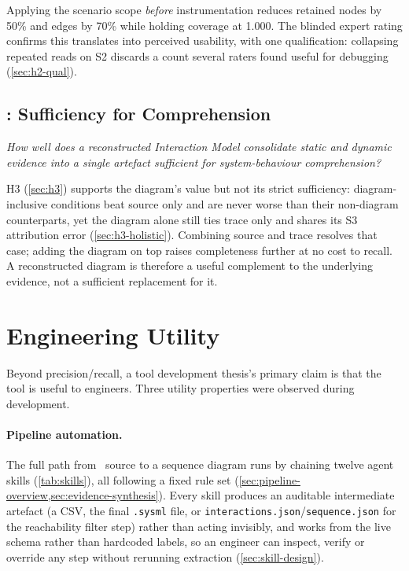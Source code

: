 Applying the scenario scope \emph{before} instrumentation reduces
retained nodes by 50\% and edges by 70\% while holding coverage at
1.000. The blinded expert rating confirms this translates into
perceived usability, with one qualification: collapsing repeated reads
on S2 discards a count several raters found useful for debugging
(\cref{sec:h2-qual}).

\subsection*{\rqthree: Sufficiency for Comprehension}

\textit{How well does a reconstructed \sysml Interaction Model
consolidate static and dynamic evidence into a single artefact sufficient
for system-behaviour comprehension?}

H3 (\cref{sec:h3}) supports the diagram's value but not its strict
sufficiency: diagram-inclusive conditions beat source only and are
never worse than their non-diagram counterparts, yet the diagram alone
still ties trace only and shares its S3 attribution error
(\cref{sec:h3-holistic}). Combining source and trace resolves that
case; adding the diagram on top raises completeness further at no cost
to recall. A reconstructed diagram is therefore a useful complement to
the underlying evidence, not a sufficient replacement for it.

\section{Engineering Utility}\label{sec:utility}

Beyond precision/recall, a tool development thesis's primary claim is
that the tool is useful to engineers. Three utility properties were
observed during development.

\paragraph{Pipeline automation.} The full path from \Cpp\ source to a
\sysml sequence diagram runs by chaining twelve agent skills
(\cref{tab:skills}), all following a fixed rule set
(\cref{sec:pipeline-overview,sec:evidence-synthesis}). Every skill
produces an auditable intermediate artefact (a CSV, the final
\texttt{.sysml} file, or \texttt{interactions.json}/\texttt{sequence.json}
for the reachability filter step) rather than acting invisibly, and works from the live
schema rather than hardcoded labels, so an engineer can inspect, verify
or override any step without rerunning extraction
(\cref{sec:skill-design}).

